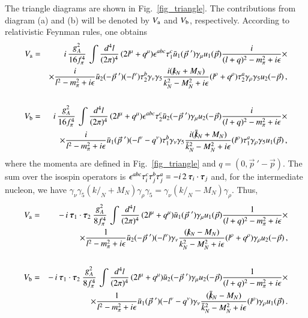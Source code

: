 \documentclass[sort&compress,preprint,3p]{elsarticle}
\newcommand{\bbox}[1]{\mbox{\boldmath $#1$}}
\begin{document}
The triangle diagrams are shown in Fig.~\ref{fig_triangle}. 
The contributions from diagram (a) and (b) will be denoted by
$V_{\rm a}$ and $V_{\rm b}$, respectively.
According to relativistic Feynman rules, one obtains
%
\begin{eqnarray}
V_{\rm a} &=& \, i\, \frac{g_A^2}{16 f_\pi^4} \,
\int \frac{d^4 l}{(2\pi)^4} \,
(2 l^\mu + q^\mu) \epsilon^{abc} \tau^c_1 
\bar{u}_1 (\vec{p}~') \gamma_\mu u_1 (\vec{p})
\frac{i}{(l+q)^2-m_\pi^2+i\epsilon}
\times \nonumber \\ && \times
\frac{i}{l^2-m_\pi^2+i\epsilon}
\bar{u}_2 (-\vec{p}~') (-l^\nu) \tau^b_2 \gamma_\nu  \gamma_5
\frac{i(k \!\!\! \slash_{N} + M_N)}{k_{N}^2 - M_N^2 + i\epsilon}
(l^\rho+q^\rho) \tau^a_2 \gamma_\rho  \gamma_5
u_2 (-\vec{p})
  \,,     \\
\nonumber \\
V_{\rm b} &=& \, i\, \frac{g_A^2}{16 f_\pi^4} \,
\int \frac{d^4 l}{(2\pi)^4} \,
(2 l^\mu + q^\mu) \epsilon^{abc} \tau^c_2 
\bar{u}_2 (-\vec{p}~') \gamma_\mu u_2 (-\vec{p})
\frac{i}{(l+q)^2-m_\pi^2+i\epsilon}
\times \nonumber \\ && \times
\frac{i}{l^2-m_\pi^2+i\epsilon}
\bar{u}_1 (\vec{p}~') (-l^\nu-q^\nu) \tau^b_1 \gamma_\nu  \gamma_5
\frac{i(\bar{k} \!\!\!\slash_{N} + M_N)}{\bar{k}_{N}^2 - M_N^2 + i\epsilon}
(l^\rho) \tau^a_1 \gamma_\rho  \gamma_5
u_1 (\vec{p})
\,,
\end{eqnarray}
where the momenta are defined in Fig.~\ref{fig_triangle}
and $q=(0,{\vec p}~' - \vec p)$. 
%
The sum over the isospin operators is 
$\epsilon^{abc} \tau_i^c \tau_j^b \tau_j^a = 
- i \, 2 \: \bbox{\tau}_i \cdot \bbox{\tau}_j $
and, for the intermediate nucleon, we have 
$\gamma_\nu  \gamma_5 (k \!\!\!\slash_{N} + M_N) \gamma_\rho  \gamma_5 =
\gamma_\nu  (k\!\!\!\slash_{N} - M_N) \gamma_\rho$. Thus,
%
\begin{eqnarray}
V_{\rm a} &=& 
- \, i \: \bbox{\tau}_1 \cdot \bbox{\tau}_2 \:
\frac{g_A^2}{8 f_\pi^4} \,
\int \frac{d^4 l}{(2\pi)^4} \,
(2 l^\mu + q^\mu) 
\bar{u}_1 (\vec{p}~') \gamma_\mu u_1 (\vec{p})
\frac{1}{(l+q)^2-m_\pi^2+i\epsilon}
\times \nonumber \\ && \times
\frac{1}{l^2-m_\pi^2+i\epsilon}
\bar{u}_2 (-\vec{p}~') (-l^\nu) \gamma_\nu  
\frac{(k \!\!\! \slash_{N} - M_N)}{k_{N}^2 - M_N^2 + i\epsilon}
(l^\rho+q^\rho) \gamma_\rho 
u_2 (-\vec{p}) \,, \\ 
\nonumber \\
V_{\rm b} &=& 
-\, i \: \bbox{\tau}_1 \cdot \bbox{\tau}_2 \:
\frac{g_A^2}{8 f_\pi^4} \,
\int \frac{d^4 l}{(2\pi)^4} \,
(2 l^\mu + q^\mu) 
\bar{u}_2 (-\vec{p}~') \gamma_\mu u_2 (-\vec{p})
\frac{1}{(l+q)^2-m_\pi^2+i\epsilon}
\times \nonumber \\ && \times
\frac{1}{l^2-m_\pi^2+i\epsilon}
\bar{u}_1 (\vec{p}~') (-l^\nu-q^\nu) \gamma_\nu 
\frac{(\bar{k} \!\!\!\slash_{N} - M_N)}{\bar{k}_{N}^2 - M_N^2 + i\epsilon}
(l^\rho) \gamma_\rho  
u_1 (\vec{p})
\,.
\end{eqnarray}
\end{document}
